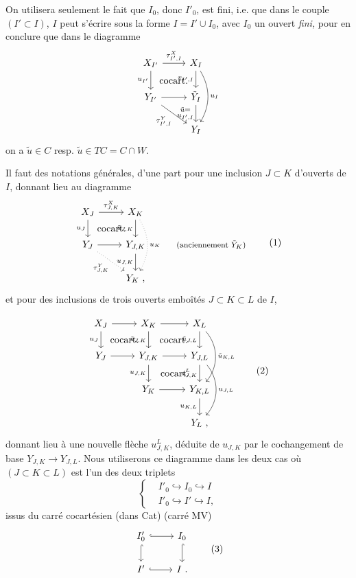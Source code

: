 \documentclass[11pt]{article}
\newcommand{\printedpage}[1]{\marginpar{\footnotesize p.~#1\ifstrequal{#1}{1}{\\[2pt]{[page 1]}}{}}}
\newcommand{\msp}[1]{\ifstrequal{#1}{page 1}{}{\marginpar{\footnotesize [#1]}}}
\newcommand{\cocart}{\textup{cocart.}}
\begin{document}
On utilisera seulement le fait que $I_0$, donc $I'_0$, est fini, i.e. que dans le couple $(I' \subset I)$, $I$ peut s'écrire sous la forme $I = I' \cup I_0$, avec $I_0$ un ouvert \textit{fini,} pour en conclure que dans le diagramme
\[
\begin{tikzcd}
X_{I'} \arrow[r, "\tau^X_{I',I}"] \arrow[d, "u_{I'}"'] \arrow[dr, phantom, "\cocart"] & X_I \arrow[d, "v_{I',I}"'] \arrow[dd, bend left=30, "u_I"] \\
Y_{I'} \arrow[r] \arrow[dr, "\tau^Y_{I',I}"'] & \tilde{Y}_I \arrow[d, "\substack{\tilde{u} =\\ u_{I',I}}"'] \\
& Y_I
\end{tikzcd}
\]
on a $\tilde{u} \in C$ resp. $\tilde{u} \in TC = C \cap W$.

\msp{page 14}

Il faut des notations générales, d'une part pour une inclusion $J \subset K$ d'ouverts de $I$, donnant lieu au diagramme
\[
\begin{tikzcd}
X_J \arrow[r, "\tau^X_{J,K}"] \arrow[d, "u_J"'] \arrow[dr, phantom, "\cocart"] & X_K \arrow[d, "\tilde{u}_{J,K}"'] \arrow[dd, dotted, bend left=30, "u_K"] & \\
Y_J \arrow[r] \arrow[dr, dotted, "\tau^Y_{J,K}"'] & Y_{J,K} \arrow[d, "u_{J,K}"'] & \text{\footnotesize (anciennement $\tilde{Y}_K$)} \\
& Y_K\ , &
\end{tikzcd}
\tag*{(1)}
\]
et pour des inclusions de trois ouverts emboîtés $J \subset K \subset L$ de $I$,

\printedpage{9}
\[
\begin{tikzcd}
X_J \arrow[r] \arrow[d, "u_J"'] \arrow[dr, phantom, "\cocart"] & X_K \arrow[r] \arrow[d, "\tilde{u}_{J,K}"'] \arrow[dr, phantom, "\cocart"] & X_L \arrow[d, "\tilde{u}_{J,L}"'] \arrow[dd, bend left=40, "\tilde{u}_{K,L}"] \\
Y_J \arrow[r] & Y_{J,K} \arrow[r] \arrow[d, "u_{J,K}"'] \arrow[dr, phantom, "\cocart"] & Y_{J,L} \arrow[d, "u^L_{J,K}"'] \arrow[dd, bend left=40, "u_{J,L}"] \\
 & Y_K \arrow[r] & Y_{K,L} \arrow[d, "u_{K,L}"'] \\
 & & Y_L\ ,
\end{tikzcd}
\tag*{(2)}
\]
donnant lieu à une nouvelle flèche $u^L_{J,K}$, déduite de $u_{J,K}$ par le cochangement de base \msp{page 15} $Y_{J,K} \longrightarrow Y_{J,L}$. Nous utiliserons ce diagramme dans les deux cas où $(J \subset K \subset L)$ est l'un des deux triplets
\[
\left\{
\begin{aligned}
& I'_0 \hookrightarrow I_0 \hookrightarrow I \\
& I'_0 \hookrightarrow I' \hookrightarrow I,
\end{aligned}
\right.
\]
issus du carré cocartésien (dans Cat) (carré MV)
\[
\begin{tikzcd}
I'_0 \arrow[r, hook] \arrow[d, hook] & I_0 \arrow[d, hook] \\
I' \arrow[r, hook] & I\ .
\end{tikzcd}
\tag*{(3)}
\]
\end{document}
